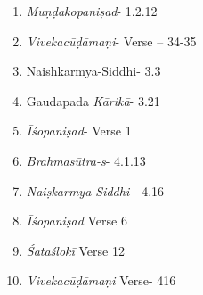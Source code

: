 \begin{enumerate}
\itemsep=0pt
\item
  \emph{Muṇḍakopaniṣad}- 1.2.12
\item
  \emph{Vivekacūḍāmaṇi}- Verse -- 34-35
\item
  Naishkarmya-Siddhi- 3.3
\item
  Gaudapada \emph{Kārikā}- 3.21
\item
  \emph{Īśopaniṣad}- Verse 1
\item
  \emph{Brahmasūtra-s}- 4.1.13
\item
  \emph{Naiṣkarmya Siddhi} - 4.16
\item
  \emph{Īśopaniṣad} Verse 6
\item
  \emph{Śataślokī} Verse 12
\item
  \emph{Vivekacūḍāmaṇi} Verse- 416
\end{enumerate}
